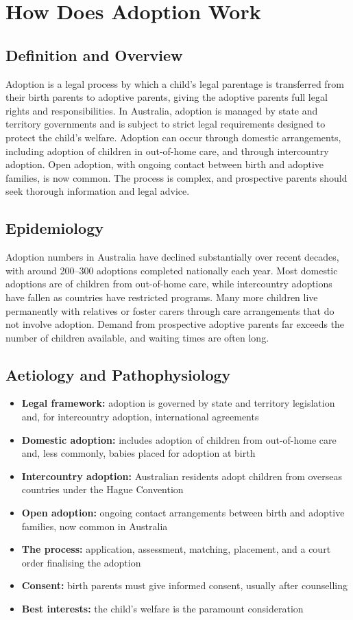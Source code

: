 \chapter{How Does Adoption Work}

\section*{Definition and Overview}
Adoption is a legal process by which a child's legal parentage is transferred from their birth parents to adoptive parents, giving the adoptive parents full legal rights and responsibilities. In Australia, adoption is managed by state and territory governments and is subject to strict legal requirements designed to protect the child's welfare. Adoption can occur through domestic arrangements, including adoption of children in out-of-home care, and through intercountry adoption. Open adoption, with ongoing contact between birth and adoptive families, is now common. The process is complex, and prospective parents should seek thorough information and legal advice.

\section*{Epidemiology}
Adoption numbers in Australia have declined substantially over recent decades, with around 200--300 adoptions completed nationally each year. Most domestic adoptions are of children from out-of-home care, while intercountry adoptions have fallen as countries have restricted programs. Many more children live permanently with relatives or foster carers through care arrangements that do not involve adoption. Demand from prospective adoptive parents far exceeds the number of children available, and waiting times are often long.

\section*{Aetiology and Pathophysiology}
\begin{itemize}
    \item \textbf{Legal framework:} adoption is governed by state and territory legislation and, for intercountry adoption, international agreements
    \item \textbf{Domestic adoption:} includes adoption of children from out-of-home care and, less commonly, babies placed for adoption at birth
    \item \textbf{Intercountry adoption:} Australian residents adopt children from overseas countries under the Hague Convention
    \item \textbf{Open adoption:} ongoing contact arrangements between birth and adoptive families, now common in Australia
    \item \textbf{The process:} application, assessment, matching, placement, and a court order finalising the adoption
    \item \textbf{Consent:} birth parents must give informed consent, usually after counselling
    \item \textbf{Best interests:} the child's welfare is the paramount consideration
\end{itemize}

